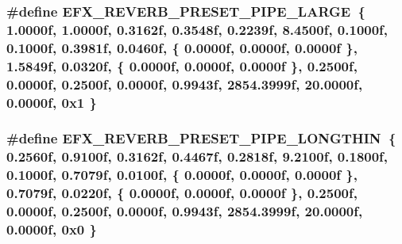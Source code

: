 \subsubsection[{\texorpdfstring{E\+F\+X\+\_\+\+R\+E\+V\+E\+R\+B\+\_\+\+P\+R\+E\+S\+E\+T\+\_\+\+P\+I\+P\+E\+\_\+\+L\+A\+R\+GE}{EFX_REVERB_PRESET_PIPE_LARGE}}]{\setlength{\rightskip}{0pt plus 5cm}\#define E\+F\+X\+\_\+\+R\+E\+V\+E\+R\+B\+\_\+\+P\+R\+E\+S\+E\+T\+\_\+\+P\+I\+P\+E\+\_\+\+L\+A\+R\+GE~\{ 1.\+0000f, 1.\+0000f, 0.\+3162f, 0.\+3548f, 0.\+2239f, 8.\+4500f, 0.\+1000f, 0.\+1000f, 0.\+3981f, 0.\+0460f, \{ 0.\+0000f, 0.\+0000f, 0.\+0000f \}, 1.\+5849f, 0.\+0320f, \{ 0.\+0000f, 0.\+0000f, 0.\+0000f \}, 0.\+2500f, 0.\+0000f, 0.\+2500f, 0.\+0000f, 0.\+9943f, 2854.\+3999f, 20.\+0000f, 0.\+0000f, 0x1 \}}\hypertarget{efx-presets_8h_a4e36a870da21838c4ddc94e9bcec4f53}{}\label{efx-presets_8h_a4e36a870da21838c4ddc94e9bcec4f53}
\subsubsection[{\texorpdfstring{E\+F\+X\+\_\+\+R\+E\+V\+E\+R\+B\+\_\+\+P\+R\+E\+S\+E\+T\+\_\+\+P\+I\+P\+E\+\_\+\+L\+O\+N\+G\+T\+H\+IN}{EFX_REVERB_PRESET_PIPE_LONGTHIN}}]{\setlength{\rightskip}{0pt plus 5cm}\#define E\+F\+X\+\_\+\+R\+E\+V\+E\+R\+B\+\_\+\+P\+R\+E\+S\+E\+T\+\_\+\+P\+I\+P\+E\+\_\+\+L\+O\+N\+G\+T\+H\+IN~\{ 0.\+2560f, 0.\+9100f, 0.\+3162f, 0.\+4467f, 0.\+2818f, 9.\+2100f, 0.\+1800f, 0.\+1000f, 0.\+7079f, 0.\+0100f, \{ 0.\+0000f, 0.\+0000f, 0.\+0000f \}, 0.\+7079f, 0.\+0220f, \{ 0.\+0000f, 0.\+0000f, 0.\+0000f \}, 0.\+2500f, 0.\+0000f, 0.\+2500f, 0.\+0000f, 0.\+9943f, 2854.\+3999f, 20.\+0000f, 0.\+0000f, 0x0 \}}\hypertarget{efx-presets_8h_a43dbaaefa9cfb5518b2b4e67149556ce}{}\label{efx-presets_8h_a43dbaaefa9cfb5518b2b4e67149556ce}
